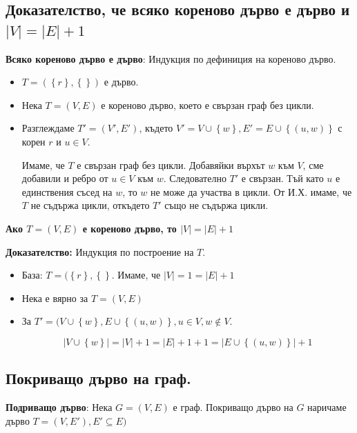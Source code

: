 \documentclass{article}
\renewcommand{\\}{\newline}
\newcommand{\doc}{\textbf{Доказателство: }}
\begin{document}
      \subsection{Доказателство, че всяко кореново дърво е дърво и \(\left|V\right| = \left|E\right| + 1\) } 
      \textbf{Всяко кореново дърво е дърво}: Индукция по дефиниция на кореново дърво. 
      \begin{itemize}
          \item \(T = (\left\{r\right\}, \left\{\right\})\) е дърво. 
          \item Нека \(T = (V, E)\) е кореново дърво, което е свързан граф без цикли.
          \item Разглеждаме \(T' = (V', E')\), където \(V' = V \cup \left\{w\right\}, E' = E \cup \left\{(u, w)\right\}\) с корен \(r\) и \(u \in V\). 

            Имаме, че \(T\) е свързан граф без цикли. Добавяйки върхът \(w\) към \(V\), сме добавили и ребро от \(u \in V\) към \(w\). Следователно \(T'\) е свързан. Тъй като \(u\) е единствения съсед на \(w\), то \(w\) не може да участва в цикли. От И.Х. имаме, че \(T\) не съдържа цикли, откъдето \(T'\) също не съдържа цикли.    

      \end{itemize}

      \textbf{Ако \(T = (V, E)\) е кореново дърво, то \(\left|V\right| = \left|E\right| + 1\)   }

      \doc Индукция по построение на \(T\). 
      \begin{itemize}
          \item База: \(T = (\left\{r\right\}, \left\{\right\}\). Имаме, че \(\left|V\right| = 1 = \left|E\right| + 1\)  
          \item Нека е вярно за \(T = (V, E)\)
          \item За \(T' = (V \cup \left\{w\right\}, E \cup \left\{(u, w)\right\}, u \in V, w \not \in V \). 

            \[
              \left|V \cup \left\{w\right\}\right| = \left|V\right| + 1 = \left|E\right| + 1 + 1 = \left|E \cup \left\{(u, w)\right\}\right| + 1
            \] 

      \end{itemize}

      \subsection{Покриващо дърво на граф.} 
      \textbf{Подриващо дърво}: Нека \(G = (V, E)\) е граф. Покриващо дърво на \(G\) наричаме дърво \(T = (V, E'), E'\subseteq E)\)     
\end{document}
